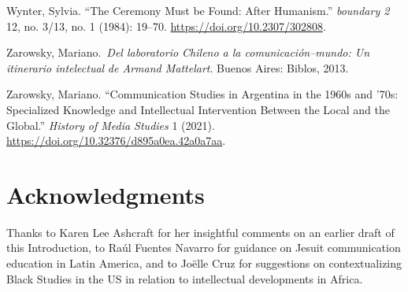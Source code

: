 \documentclass{tufte-handout}
\begin{document}
\begin{hangparas}{.25in}{1}
Wynter, Sylvia. ``The Ceremony Must be Found: After Humanism.''
\emph{boundary 2} 12, no. 3/13, no. 1 (1984): 19--70.
\url{https://doi.org/10.2307/302808}.

Zarowsky, Mariano.~\emph{Del laboratorio Chileno a la
comunicación--mundo: Un itinerario intelectual} \emph{de Armand
Mattelart}. Buenos Aires: Biblos, 2013.

Zarowsky, Mariano. ``Communication Studies in Argentina in the 1960s and
'70s: Specialized Knowledge and Intellectual Intervention Between the
Local and the Global.'' \emph{History of Media Studies} 1 (2021).
\url{https://doi.org/10.32376/d895a0ea.42a0a7aa}.



\end{hangparas}


\vspace{3em}

\hypertarget{acknowledgments}{%
\section{Acknowledgments}\label{acknowledgments}}

Thanks to Karen Lee Ashcraft for her insightful comments on an earlier
draft of this Introduction, to Raúl Fuentes Navarro for guidance on
Jesuit communication education in Latin America, and to Joëlle Cruz for
suggestions on contextualizing Black Studies in the US in relation to
intellectual developments in Africa.
\end{document}
